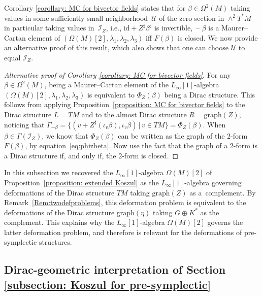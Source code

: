 \documentclass[pdftex]{sigma}
\numberwithin{equation}{section}
\renewcommand{\graph}{\mathrm{graph}}
\renewcommand{\graph}{\mathrm{graph}}
\begin{document}
Corollary \ref{corollary: MC for bivector fields} states that for $\beta \in\Omega^2(M)$ taking values in some sufficiently small neighbor\-hood~$\mathcal{U}$ of the zero section in $\wedge^2 T^*M$ -- in particular taking values in~$\mathcal{I}_Z$, i.e., $\mathrm{id} + Z^\sharp \beta^\sharp$ is invertible,~-- $\beta$ is a Maurer--Cartan element of $(\Omega(M)[2],\lambda_1,\lambda_2,\lambda_3)$ if{f} $F(\beta)$
is closed. We now provide an alternative proof of this result, which also shows that one can choose $\mathcal{U}$ to equal $\mathcal{I}_Z$.

\begin{proof}[Alternative proof of Corollary \ref{corollary: MC for bivector fields}] For {any $\beta\in\Omega^2(M)$}, being a Maurer--Cartan element of the $L_{\infty}[1]$-algebra $(\Omega(M)[2],\lambda_1,\lambda_2,\lambda_3)$ is equivalent to $\Phi_Z(\beta)$ being a Dirac structure. This follows from applying Proposition~\ref{proposition: MC for bivector fields} to the Dirac structure $L=TM$ and to the almost Dirac structure $R=\mathrm{graph}(Z)$, noticing that $\Gamma_{-\beta}=\{(v+Z^\sharp(\iota_v\beta),\iota_v\beta)\,|\,v\in TM\}=\Phi_Z(\beta)$. When $\beta\in\Gamma(\mathcal{I}_Z)$, we know that $\Phi_Z(\beta)$ can be written as the graph of the $2$-form $F(\beta)$, by equation~\eqref{eq:phizbeta}. Now use the fact that the graph of a $2$-form is a Dirac structure if, and only if, the $2$-form is closed.
\end{proof}

\begin{Remark}In this subsection we recovered the $L_\infty[1]$-algebra {$\Omega(M)[2]$} of Proposition~\ref{proposition: extended Koszul} as the $L_\infty[1]$-algebra governing deformations of the Dirac structure $TM$ taking $\graph(Z)$ as a~complement. By Remark~\ref{Rem:twodefproblems}, this deformation problem is equivalent to the deformations of the Dirac structure $\mathrm{graph}(\eta)$ taking $G\oplus K^*$ as the complement. This explains why the $L_\infty[1]$-algebra {$\Omega(M)[2]$} governs the latter deformation problem, and therefore is relevant for the deformations of pre-symplectic structures.
\end{Remark}

\subsection{Dirac-geometric interpretation of Section \ref{subsection: Koszul for pre-symplectic}}\label{subsection: presymplintegr}
\end{document}
